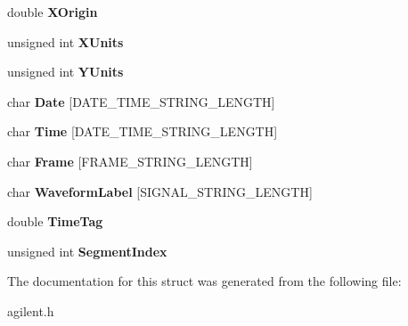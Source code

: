 \begin{DoxyCompactItemize}
\item 
\hypertarget{structAgilentWaveformHeader_a7350dfb08debd23e2abe11993da20a92}{
double {\bfseries XOrigin}}
\label{structAgilentWaveformHeader_a7350dfb08debd23e2abe11993da20a92}

\item 
\hypertarget{structAgilentWaveformHeader_ac9cce2950b5d2d1609bde58cabf25c92}{
unsigned int {\bfseries XUnits}}
\label{structAgilentWaveformHeader_ac9cce2950b5d2d1609bde58cabf25c92}

\item 
\hypertarget{structAgilentWaveformHeader_a768d699a26a4bf7315c5448d793b42d7}{
unsigned int {\bfseries YUnits}}
\label{structAgilentWaveformHeader_a768d699a26a4bf7315c5448d793b42d7}

\item 
\hypertarget{structAgilentWaveformHeader_aaeba585ff4caf344e4035324b5a89ca9}{
char {\bfseries Date} \mbox{[}DATE\_\-TIME\_\-STRING\_\-LENGTH\mbox{]}}
\label{structAgilentWaveformHeader_aaeba585ff4caf344e4035324b5a89ca9}

\item 
\hypertarget{structAgilentWaveformHeader_aac648fb7ad94fa97572c2d8da30c40fe}{
char {\bfseries Time} \mbox{[}DATE\_\-TIME\_\-STRING\_\-LENGTH\mbox{]}}
\label{structAgilentWaveformHeader_aac648fb7ad94fa97572c2d8da30c40fe}

\item 
\hypertarget{structAgilentWaveformHeader_ad010ae47cc0cf2bad233404c8535d274}{
char {\bfseries Frame} \mbox{[}FRAME\_\-STRING\_\-LENGTH\mbox{]}}
\label{structAgilentWaveformHeader_ad010ae47cc0cf2bad233404c8535d274}

\item 
\hypertarget{structAgilentWaveformHeader_a9be550ef14230d787f182f915211ddd9}{
char {\bfseries WaveformLabel} \mbox{[}SIGNAL\_\-STRING\_\-LENGTH\mbox{]}}
\label{structAgilentWaveformHeader_a9be550ef14230d787f182f915211ddd9}

\item 
\hypertarget{structAgilentWaveformHeader_acdc3268b7a5c30e4c790f7dacdc56445}{
double {\bfseries TimeTag}}
\label{structAgilentWaveformHeader_acdc3268b7a5c30e4c790f7dacdc56445}

\item 
\hypertarget{structAgilentWaveformHeader_a83e3f9f56dd7e1abd0523aebbae97904}{
unsigned int {\bfseries SegmentIndex}}
\label{structAgilentWaveformHeader_a83e3f9f56dd7e1abd0523aebbae97904}

\end{DoxyCompactItemize}


The documentation for this struct was generated from the following file:\begin{DoxyCompactItemize}
\item 
agilent.h\end{DoxyCompactItemize}
